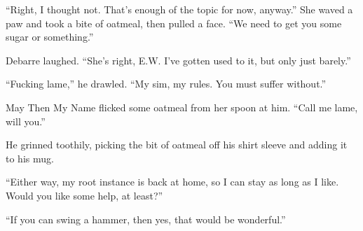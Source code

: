 ``Right, I thought not. That's enough of the topic for now, anyway.'' She waved a paw and took a bite of oatmeal, then pulled a face. ``We need to get you some sugar or something.''

Debarre laughed. ``She's right, E.W. I've gotten used to it, but only just barely.''

``Fucking lame,'' he drawled. ``My sim, my rules. You must suffer without.''

May Then My Name flicked some oatmeal from her spoon at him. ``Call me lame, will you.''

He grinned toothily, picking the bit of oatmeal off his shirt sleeve and adding it to his mug.

``Either way, my root instance is back at home, so I can stay as long as I like. Would you like some help, at least?''

``If you can swing a hammer, then yes, that would be wonderful.''
